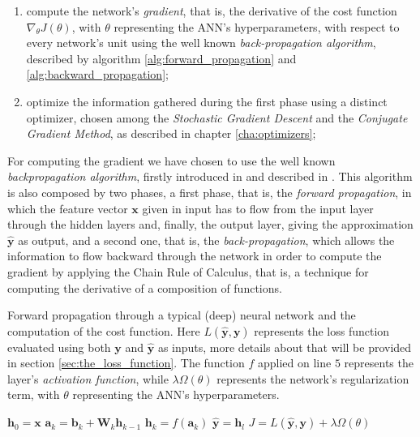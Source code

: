 		\begin{enumerate}
			\item compute the network's \textit{gradient}, that is, the derivative of the cost function
			$\nabla_{\theta} J(\theta)$, with $\theta$ representing the ANN's hyperparameters, with respect to
			every network's unit using the well known \textit{back-propagation algorithm}, described by
            algorithm \ref{alg:forward_propagation} and \ref{alg:backward_propagation};
			\item optimize the information gathered during the first phase using a distinct optimizer, chosen
			among the \textit{Stochastic Gradient Descent} and the \textit{Conjugate Gradient Method}, as
			described in chapter \ref{cha:optimizers};
		\end{enumerate}

		For computing the gradient we have chosen to use
		the well known \textit{backpropagation algorithm}, firstly introduced in \cite{10028086174} and described
		in \cite{Goodfellow-et-al-2016,haykin2009neural,mitchell1997machine}. This algorithm is
		also composed by two phases, a first phase, that is, the \textit{forward propagation}, in which the
		feature vector $\mathbf{x}$ given in input has to flow from the input layer through the hidden layers and,
		finally, the output layer, giving the approximation $\hat{\mathbf{y}}$ as output, and a second one, that
		is, the \textit{back-propagation}, which allows the information to flow backward through the network in
		order to compute the gradient by applying the Chain Rule of Calculus, that is, a technique for computing the
		derivative of a composition of functions.

		\begin{algorithm}[H]
			\caption{Forward propagation through a typical (deep) neural network and the computation of the cost
			function. Here $L(\hat{\mathbf{y}}, \mathbf{y})$ represents the loss function evaluated using both
			$\mathbf{y}$ and $\hat{\mathbf{y}}$ as inputs, more details about that will be provided in
			section \ref{sec:the_loss_function}. The function $f$ applied on line $5$ represents
			the layer's \textit{activation function}, while $\lambda \Omega(\theta)$ represents the
			network's regularization term, with $\theta$ representing the ANN's hyperparameters.}
			\label{alg:forward_propagation}
			\begin{algorithmic}[1]
					\State $\mathbf{h}_{0} = \mathbf{x}$
						\State $\mathbf{a}_{k} = \mathbf{b}_{k} + \mathbf{W}_{k}\mathbf{h}_{k - 1}$
						\State $\mathbf{h}_{k} = f(\mathbf{a}_{k})$
					\EndFor
					\State $\hat{\mathbf{y}} = \mathbf{h}_{l}$
					\State $J = L(\hat{\mathbf{y}}, \mathbf{y}) + \lambda \Omega(\theta)$
				\EndProcedure
			\end{algorithmic}
		\end{algorithm}

